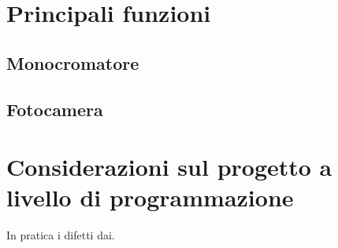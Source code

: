 \section{Principali funzioni}


\subsection{Monocromatore}
\subsection{Fotocamera}

\section{Considerazioni sul progetto a livello di programmazione}

In pratica i difetti dai.